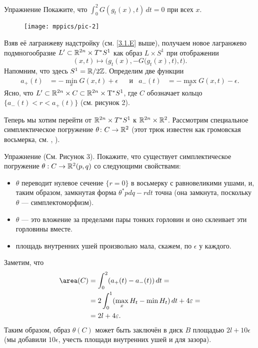 \begin{ex*}{Упражнение}
Покажите, что $\int_0^2G (g_t (x), t)\,dt = 0$ при всех $x$.
\end{ex*}

\begin{figure}[ht!]
\vskip-0mm
\centering
\texttt{[image: mppics/pic-2]}
\caption{}\label{pic-2}
\vskip0mm
\end{figure}

Взяв её лагранжеву надстройку (см. \ref{3.1.E} выше),
получаем новое лагранжево подмногообразие $L' \subset \RR^{2n} \z\times T^{\ast} S^1$ как образ $L \times S^1$ при отображении 
\[(x, t) \mapsto \Big(g_t (x), -G \big(g_t (x), t\big), t\Big).\]
Напомним, что здесь $S^1 = \mathbb{R} / 2\mathbb{Z}$.
Определим две функции 
\begin{align*}a_+ (t) &= - \min_x G (x, t) + \epsilon
&&\text{и}&
a_- (t) &= - \max_x G (x, t) - \epsilon.
\end{align*}
Ясно, что $L' \subset \mathbb{R}^{2n} \times C \subset \mathbb{R}^{2n} \times \mathrm{T}^\ast S^1$, где $C$ обозначает кольцо 
$\{a_- (t) <r <a_+ (t)\}$
(см. рисунок 2).

Теперь мы хотим перейти от $\mathbb{R}^{2n} \times T^{\ast} S^1$ к $\mathbb{R}^{2n} \times \mathbb{R}^2$.
Рассмотрим специальное симплектическое погружение $\theta\colon C \to \mathbb{R}^2$
(этот трюк известен как громовская восьмерка, см. \cite{G1}, \cite{AL}).

\begin{ex*}{Упражнение}
(См. Рисунок 3).
Покажите, что существует симплектическое погружение $\theta: C \to \mathbb{R}^2 (p, q)$ со следующими свойствами: 
\begin{itemize}
\item $\theta$ переводит нулевое сечение $\{r = 0\}$ в восьмерку с равновеликими ушами, и, таким образом, замкнутая форма $\theta^\ast pdq - rdt$ точна (она замкнута, поскольку $\theta$ --- симплектоморфизм).
\item $\theta$ --- это вложение за пределами пары тонких горловин и оно склеивает эти горловины вместе.
\item площадь внутренних ушей произвольно мала, скажем, по $\epsilon$ у каждого. 
\end{itemize}
\end{ex*}

Заметим, что \?{}{$\area=\Area$}
\begin{align*}
\area (C) 
&= \int_0^2(a_+ (t) - a_- (t))\,dt = 
\\
&=2 \int_0^1(\max_x H_t - \min H_t) \,dt + 4\epsilon =
\\
&=2l + 4\epsilon.
\end{align*}
Таким образом, образ $\theta (C)$ может быть заключён в диск $B$
площадью $2l + 10\epsilon$ (мы добавили $10\epsilon$,  учесть
  площади внутренних ушей и для зазора).

